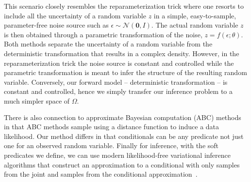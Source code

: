 This scenario closely resembles the reparameterization trick \citep{Kingma:2014, rezende2014stochastic} where one resorts to include all the uncertainty of a random variable $z$ in a simple, easy-to-sample, parameter-free noise source such as $\epsilon \sim \mathcal{N}(\mathbf{0}, I)$. The actual random variable $z$ is then obtained through a parametric transformation of the noise, $z = f(\epsilon; \theta)$. Both methods separate the 
uncertainty of a random variable from the deterministic transformation that results in a complex density. However, in the reparameterization trick the noise source is constant and controlled while the parametric transformation is meant to infer the structure of the resulting random variable. Conversely, our forward model -- deterministic transformation -- is constant and controlled, hence we simply transfer our inference problem to a much simpler space of $\Omega$.

There is also connection to approximate Bayesian computation (ABC) methods~\citep{beaumont2002approximate} in that ABC methods 
sample using a distance function to induce a data likelihood. Our method differs in that conditionals can be any predicate not just
one for an observed random variable.
Finally for inference, with the soft predicates we define, we
can use modern likelihood-free variational inference algorithms
that construct an approximation to a conditional with only samples
from the joint and samples from the conditional approximation~\citep{tran2017hierarchical}.





